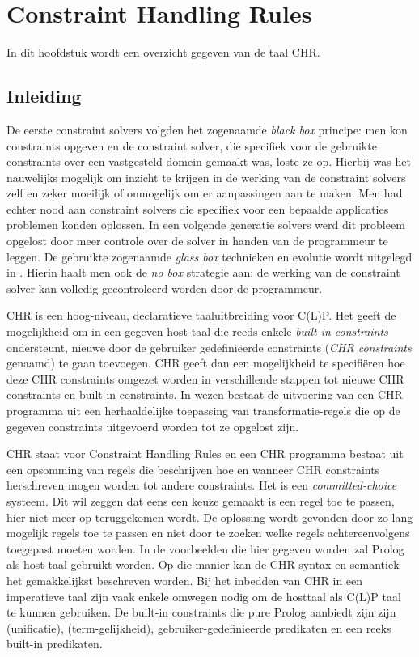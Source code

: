 \chapter{Constraint Handling Rules} \label{chap:chr}

In dit hoofdstuk wordt een overzicht gegeven van de taal CHR.

\section{Inleiding}

De eerste constraint solvers volgden het zogenaamde {\em black box} principe: men kon constraints opgeven en de constraint solver, die specifiek voor de gebruikte constraints over een vastgesteld domein gemaakt was, loste ze op. Hierbij was het nauwelijks mogelijk om inzicht te krijgen in de werking van de constraint solvers zelf en zeker moeilijk of onmogelijk om er aanpassingen aan te maken. Men had echter nood aan constraint solvers die specifiek voor een bepaalde applicaties problemen konden oplossen. In een volgende generatie solvers werd dit probleem opgelost door meer controle over de solver in handen van de programmeur te leggen. De gebruikte zogenaamde  {\em glass box} technieken en evolutie wordt uitgelegd in \cite{chr}. Hierin haalt men ook de {\em no box} strategie aan: de werking van de constraint solver kan volledig gecontroleerd worden door de programmeur.

CHR is een hoog-niveau, declaratieve taaluitbreiding voor C(L)P. Het geeft de mogelijkheid om in een gegeven host-taal die reeds enkele {\em built-in constraints} ondersteunt, nieuwe door de gebruiker gedefini\"eerde constraints ({\em CHR constraints} genaamd) te gaan toevoegen. CHR geeft dan een mogelijkheid te specifi\"eren hoe deze CHR constraints omgezet worden in verschillende stappen tot nieuwe CHR constraints en built-in constraints. In wezen bestaat de uitvoering van een CHR programma uit een herhaaldelijke toepassing van transformatie-regels die op de gegeven constraints uitgevoerd worden tot ze opgelost zijn.

CHR staat voor Constraint Handling Rules en een CHR programma bestaat uit een opsomming van regels die beschrijven hoe en wanneer CHR constraints herschreven mogen worden tot andere constraints. Het is een {\em committed-choice} systeem. Dit wil zeggen dat eens een keuze gemaakt is een regel toe te passen, hier niet meer op teruggekomen wordt. De oplossing wordt gevonden door zo lang mogelijk regels toe te passen en niet door te zoeken welke regels achtereenvolgens toegepast moeten worden. In de voorbeelden die hier gegeven worden zal Prolog als host-taal gebruikt worden. Op die manier kan de CHR syntax en semantiek het gemakkelijkst beschreven worden. Bij het inbedden van CHR in een imperatieve taal zijn vaak enkele omwegen nodig om de hosttaal als C(L)P taal te kunnen gebruiken. De built-in constraints die pure Prolog aanbiedt zijn zijn \code{=} (unificatie), \code{==} (term-gelijkheid), gebruiker-gedefinieerde predikaten en een reeks built-in predikaten.

